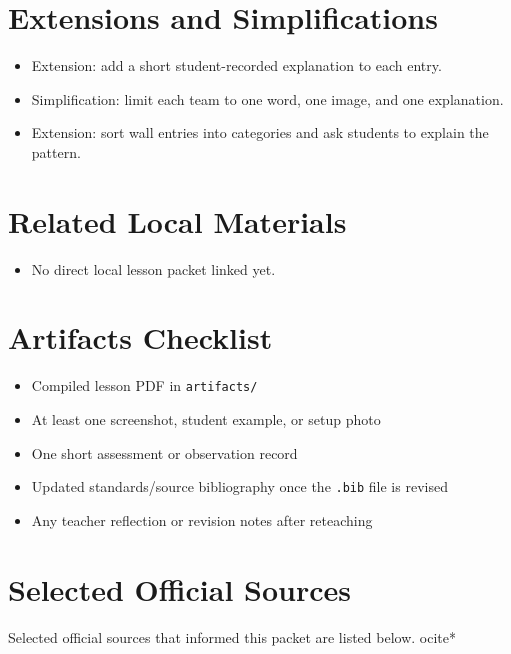 \documentclass[11pt]{article}
\begin{document}
\section*{Extensions and Simplifications}
\begin{itemize}[leftmargin=*]
\item Extension: add a short student-recorded explanation to each entry.
\item Simplification: limit each team to one word, one image, and one explanation.
\item Extension: sort wall entries into categories and ask students to explain the pattern.
\end{itemize}

\section*{Related Local Materials}
\begin{itemize}[leftmargin=*]
\item No direct local lesson packet linked yet.
\end{itemize}

\section*{Artifacts Checklist}
\begin{itemize}[leftmargin=*]
\item Compiled lesson PDF in \texttt{artifacts/}
\item At least one screenshot, student example, or setup photo
\item One short assessment or observation record
\item Updated standards/source bibliography once the \texttt{.bib} file is revised
\item Any teacher reflection or revision notes after reteaching
\end{itemize}

\section*{Selected Official Sources}
Selected official sources that informed this packet are listed below.
ocite{*}



\end{document}
